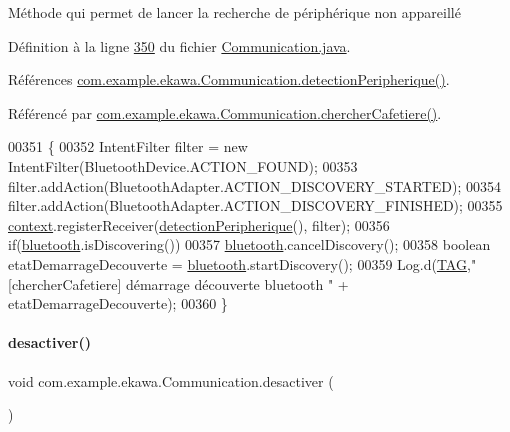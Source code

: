 Méthode qui permet de lancer la recherche de périphérique non appareillé 



Définition à la ligne \hyperlink{_communication_8java_source_l00350}{350} du fichier \hyperlink{_communication_8java_source}{Communication.\+java}.



Références \hyperlink{_communication_8java_source_l00140}{com.\+example.\+ekawa.\+Communication.\+detection\+Peripherique()}.



Référencé par \hyperlink{_communication_8java_source_l00276}{com.\+example.\+ekawa.\+Communication.\+chercher\+Cafetiere()}.


\begin{DoxyCode}
00351     \{
00352         IntentFilter filter = \textcolor{keyword}{new} IntentFilter(BluetoothDevice.ACTION\_FOUND);
00353         filter.addAction(BluetoothAdapter.ACTION\_DISCOVERY\_STARTED);
00354         filter.addAction(BluetoothAdapter.ACTION\_DISCOVERY\_FINISHED);
00355         \hyperlink{classcom_1_1example_1_1ekawa_1_1_communication_aa5ae3c4eaab6ec31d3b358431e812d00}{context}.registerReceiver(\hyperlink{classcom_1_1example_1_1ekawa_1_1_communication_a4e46e30e8c22ae617b52260d198a76ca}{detectionPeripherique}(), filter);
00356         \textcolor{keywordflow}{if}(\hyperlink{classcom_1_1example_1_1ekawa_1_1_communication_a0ed43f74b2eae7e8f150b049953da384}{bluetooth}.isDiscovering())
00357             \hyperlink{classcom_1_1example_1_1ekawa_1_1_communication_a0ed43f74b2eae7e8f150b049953da384}{bluetooth}.cancelDiscovery();
00358         \textcolor{keywordtype}{boolean} etatDemarrageDecouverte = \hyperlink{classcom_1_1example_1_1ekawa_1_1_communication_a0ed43f74b2eae7e8f150b049953da384}{bluetooth}.startDiscovery();
00359         Log.d(\hyperlink{classcom_1_1example_1_1ekawa_1_1_communication_af355bac38153a4e6d1cda0b3e74bc1c7}{TAG},\textcolor{stringliteral}{"[chercherCafetiere] démarrage découverte bluetooth "} + etatDemarrageDecouverte);
00360     \}
\end{DoxyCode}
\mbox{\label{classcom_1_1example_1_1ekawa_1_1_communication_a230dde1900a47e26832b7467eddc556a}} 
\paragraph{\texorpdfstring{desactiver()}{desactiver()}}
{\footnotesize\ttfamily void com.\+example.\+ekawa.\+Communication.\+desactiver (\begin{DoxyParamCaption}{ }\end{DoxyParamCaption})}



